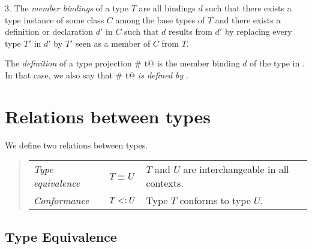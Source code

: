 \documentclass[11pt]{report}
\begin{document}
3. The {\em member bindings} of a type $T$ are all bindings $d$ such that
there exists a type instance of some class $C$ among the base types of $T$
and there exists a definition or declaration $d'$ in $C$
such that $d$ results from $d'$ by replacing every
type $T'$ in $d'$ by $T'$ seen as a member of $C$ from $T$.

The {\em definition} of a type projection \verb@S # t@ is the member
binding $d$ of the type \verb@t@ in \verb@S@. In that case, we also say
that \verb@S # t@ {\em is defined by} \verb@d@.

\section{Relations between types}

We define two relations between types.
\begin{quote}\begin{tabular}{l@{\tab}l@{\tab}l}
\em Type equivalence & $T \equiv U$ & $T$ and $U$ are interchangeable
in all contexts.
\\
\em Conformance & $T <: U$ & Type $T$ conforms to type $U$.
\end{tabular}\end{quote}

\subsection{Type Equivalence}
\label{sec:type-equiv}
\end{document}
